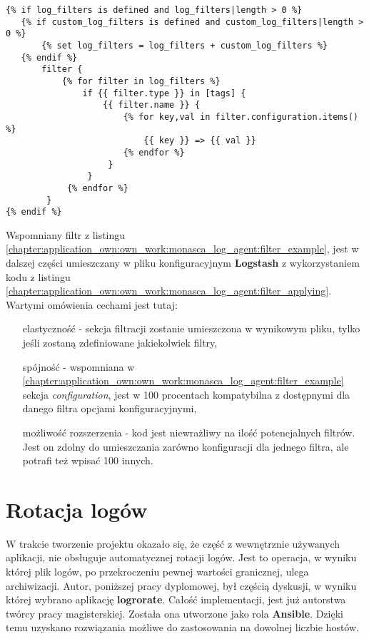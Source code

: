 \begin{listing}[H]
    \begin{verbatim}
{% if log_filters is defined and log_filters|length > 0 %}
   {% if custom_log_filters is defined and custom_log_filters|length > 0 %}
       {% set log_filters = log_filters + custom_log_filters %}
   {% endif %}
       filter {
           {% for filter in log_filters %}
               if {{ filter.type }} in [tags] {
                   {{ filter.name }} {
                       {% for key,val in filter.configuration.items() %}
                           {{ key }} => {{ val }}
                       {% endfor %}
                    }
                }
            {% endfor %}
        }
{% endif %}
    \end{verbatim}
    \label{chapter:application_own:own_work:monasca_log_agent:filter_applying}
    \caption[Wpisanie filtrów do pliku konfiguracyjnego \textbf{Logstash}]{
        Wpisanie filtrów do pliku konfiguracyjnego \textbf{Logstash}, źródło: \url{https://github.com/FujitsuEnablingSoftwareTechnologyGmbH/ansible-monasca-log-agent/blob/master/templates/agent.conf.j2}}
\end{listing}

Wspomniany filtr z listingu \ref{chapter:application_own:own_work:monasca_log_agent:filter_example}, jest w dalszej części umieszczany
w pliku konfiguracyjnym \textbf{Logstash} z wykorzystaniem kodu z listingu \ref{chapter:application_own:own_work:monasca_log_agent:filter_applying}. 
Wartymi omówienia cechami jest tutaj:
\begin{itemize}
    \item[elastyczność] - sekcja filtracji zostanie umieszczona w wynikowym pliku, tylko jeśli zostaną zdefiniowane jakiekolwiek filtry,
    \item[spójność] - wspomniana w \ref{chapter:application_own:own_work:monasca_log_agent:filter_example} sekcja \textit{configuration}, jest
    w 100 procentach kompatybilna z dostępnymi dla danego filtra opcjami konfiguracyjnymi,
    \item[możliwość rozszerzenia] - kod jest niewrażliwy na ilość potencjalnych filtrów. Jest on zdolny do umieszczania zarówno konfiguracji dla jednego
    filtra, ale potrafi też wpisać 100 innych. 
\end{itemize}

\section{Rotacja logów}
W trakcie tworzenie projektu okazało się, że część z wewnętrznie używanych aplikacji, nie obsługuje automatycznej rotacji logów. Jest
to operacja, w wyniku której plik logów, po przekroczeniu pewnej wartości granicznej, ulega archiwizacji. Autor, poniższej pracy dyplomowej,
był częścią dyskusji, w wyniku której wybrano aplikację \textbf{logrorate}. Całość implementacji, jest już autorstwa twórcy pracy magisterskiej.
Została ona utworzone jako rola \textbf{Ansible}. Dzięki temu uzyskano rozwiązania możliwe do zastosowania na dowolnej liczbie hostów.

